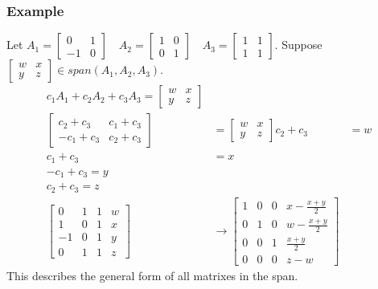 \documentclass{math}
\begin{document}
\subsubsection*{Example}
Let \( A_1 = \begin{bmatrix}0 & 1 \\ -1 & 0\end{bmatrix} \quad
  A_2 = \begin{bmatrix}1 & 0 \\ 0 & 1\end{bmatrix} \quad
  A_3 = \begin{bmatrix}1 & 1 \\ 1 & 1\end{bmatrix} \). Suppose
\( \begin{bmatrix}w & x \\ y & z\end{bmatrix}\in span(A_1,A_2,A_3) \).
\begin{align*}
  c_1A_1+c_2A_2+c_3A_3 = \begin{bmatrix}
    w & x \\
    y & z
  \end{bmatrix} \\
  \begin{bmatrix}
    c_2+c_3 & c_1+c_3 \\
    -c_1+c_3 & c_2+c_3
  \end{bmatrix} &= \begin{bmatrix}
    w & x \\
    y & z
  \end{bmatrix}
  c_2+c_3 &= w \\
  c_1+c_3 &= x \\
  -c_1+c_3 = y \\
  c_2+c_3 = z \\
  \left[\begin{array}{ccc|c}
    0 & 1 & 1 & w \\
    1 & 0 & 1 & x \\
    -1 & 0 & 1 & y \\
    0 & 1 & 1 & z
  \end{array}\right] &\to \left[\begin{array}{ccc|c}
    1 & 0 & 0 & x-\frac{x+y}{2} \\
    0 & 1 & 0 & w-\frac{x+y}{2} \\
    0 & 0 & 1 & \frac{x+y}{2} \\
    0 & 0 & 0 & z-w
  \end{array}\right]
\end{align*}
This describes the general form of all matrixes in the span.
\end{document}

